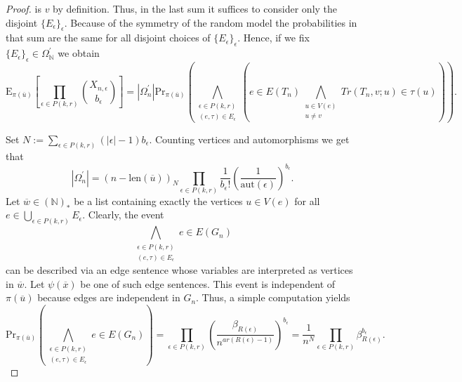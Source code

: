 \documentclass[12pt,notitlepage,a4paper]{article}
\theoremstyle{definition}
\newcommand{\N}{\mathbb{N}}
\newcommand{\aut}{\mathrm{aut}}
\newcommand{\len}{\mathrm{len}}
\begin{document}
\begin{proof}
	is $v$ by definition.  
	Thus, in the last sum it suffices to consider only 
	the disjoint $\{E_\epsilon\}_\epsilon$.
	Because of the symmetry of the random model the probabilities
	in that sum are the same for all disjoint choices of
	$\{E_\epsilon\}_\epsilon$.
	Hence, if we fix
	$\{E_\epsilon\}_{\epsilon}\in \Omega^\prime_\N$
	we obtain
	\begin{equation} \label{eqn:aux2}
	\mathrm{E}_{\pi(\overline{u})}
	\left[
	\prod_{\epsilon\in P(k,r)} \binom{X_{n,\epsilon}}{b_\epsilon}	
	\right]
	= 
	|\Omega_n^\prime| 
	\mathrm{Pr}_{\pi(\overline{u})}\left(
	\bigwedge_{\substack{
			\epsilon\in P(k,r)\\
			(e, \tau)\in E_{\epsilon}
	}} \left(
	e\in E(T_n) \bigwedge_{\substack{
			u\in V(e)\\
			u\neq v}} Tr(T_n,v;u)\in \tau(u)		
	\right)
	\right). 		
	\end{equation}
	
	Set $N:=\sum_{\epsilon\in P(k,r)} 
	(|\epsilon|-1)  b_\epsilon$.
	Counting vertices and automorphisms we get that
	\begin{equation} \label{eqn:aux3}
	|\Omega_n^\prime|= (n-\len(\overline{u}))_{N}
	\prod_{\epsilon\in P(k,r)}
	\frac{1}{b_\epsilon!}  
	\left( \frac{1}{\aut(\epsilon)} \right)^
	{b_\epsilon} .
	\end{equation}
	Let $\overline{w}\in (\N)_*$ be a list containing exactly
	the vertices $u\in V(e)$ for all $e\in 
	\bigcup_{\epsilon\in P(k,r)} E_\epsilon$. 
	Clearly, the event 
	\[ \bigwedge_{\substack{
			\epsilon\in P(k,r)\\
			(e, \tau)\in E_{\epsilon}
	}} e\in E(G_n)
	\]  can be described via an edge sentence
	whose variables are interpreted as vertices in $\overline{w}$.
	Let $\psi(\overline{x})$ be one of such edge sentences.
	This event is independent of $\pi(\overline{u})$ because edges are
	independent in $G_n$. Thus, a simple computation yields
	\[ 
	\mathrm{Pr}_{\pi(\overline{u})}
	\left(\bigwedge_{\substack{
			\epsilon\in P(k,r)\\
			(e, \tau)\in E_{\epsilon}
	}} e\in E(G_n)\right) = \prod_{\epsilon\in
	P(k,r)} \left(
	\frac{\beta_{R(\epsilon)}}{n^{ar(R(\epsilon)-1)}}
	\right)^{b_\epsilon}=
	\frac{1}{n^N}
	\prod_{\epsilon\in
	P(k,r)} \beta_{R(\epsilon)}^{b_\epsilon}.
	\]
	

\end{proof}
\end{document}
